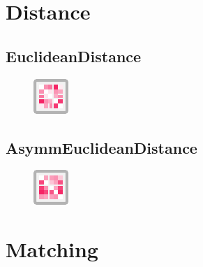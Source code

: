 \documentclass{ol-softwaremanual}
\begin{document}
\section{Distance}
\subsection{EuclideanDistance}
\begin{figure}[h]
    \centering
    \includegraphics[width = .5\textwidth]{figures/Icons/DISTANCESYMM.pdf}
\end{figure}

\subsection{AsymmEuclideanDistance}
\begin{figure}[h]
    \centering
    \includegraphics[width = .5\textwidth]{figures/Icons/DISTANCEASYMM.pdf}
\end{figure}

\section{Matching}
\end{document}
